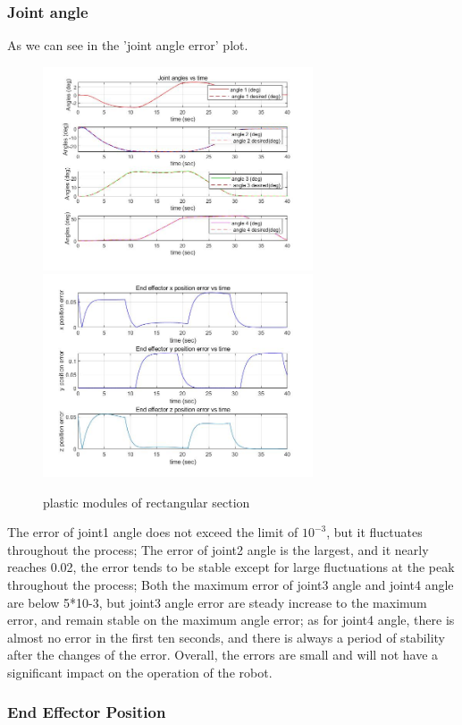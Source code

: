 \subsubsection*{Joint angle}


As we can see in the 'joint angle error' plot.

\begin{figure}[htbp]
	\centering
	\includegraphics[width=8cm]{./fig/4.jpg}
	\includegraphics[width=8cm]{./fig/6.jpg}
	\caption{plastic modules of rectangular section}
	\label{F 5.11}
\end{figure}

The error of joint1 angle does not exceed the limit of $10^{-3}$, but it fluctuates throughout the process;
The error of joint2 angle is the largest, and it nearly reaches 0.02, the error tends to be stable except for large fluctuations at the peak throughout the process;
Both the maximum error of joint3 angle and joint4 angle are below 5*10-3, but joint3 angle error are steady increase to the maximum error, and remain stable on the maximum angle error; as for joint4 angle, there is almost no error in the first ten seconds, and there is always a period of stability after the changes of the error.
Overall, the errors are small and will not have a significant impact on the operation of the robot.

\subsubsection*{End Effector Position}



